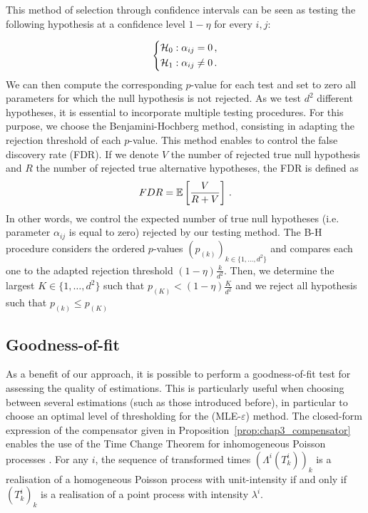    This method of selection through confidence intervals can be seen as testing the following hypothesis at a confidence level $1-\eta$ for every $i,j$:
   
   \[
   \begin{dcases}
       \mathcal{H}_0 : \alpha_{ij} = 0 \,,\\
       \mathcal{H}_1 : \alpha_{ij} \neq 0\,.
   \end{dcases}
   \]
   We can then compute the corresponding $p$-value for each test and set to zero all parameters for which the null hypothesis is not rejected. As we test $d^2$ different hypotheses, it is essential to incorporate multiple testing procedures. For this purpose, we choose the Benjamini-Hochberg method, consisting in adapting the rejection threshold of each $p$-value. This method enables to control the false discovery rate (FDR). If we denote $V$ the number of rejected true null hypothesis and $R$ the number of rejected true alternative hypotheses, the FDR is defined as \[FDR = {\mathbb E}\left[\frac{V}{R+V}\right]\,.\] In other words, we control the expected number of true null hypotheses (i.e. parameter $\alpha_{ij}$ is equal to zero) rejected by our testing method. The B-H procedure considers the ordered $p$-values $(p_{(k)})_{k\in\{1, \ldots, d^2\}}$ and compares each one to the adapted rejection threshold $(1-\eta) \frac{k}{d^2}$. Then, we determine the largest $K\in\{1, \ldots, d^2\}$ such that $p_{(K)} < (1-\eta) \frac{K}{d^2}$ and we reject all hypothesis such that $p_{(k)} \leq p_{(K)}$

  \subsection{Goodness-of-fit}\label{sec:chap3_goodness}
    As a benefit of our approach, it is possible to perform a goodness-of-fit test for assessing the quality of estimations. This is particularly useful when choosing between several estimations (such as those introduced before), in particular to choose an optimal level of thresholding for the (MLE-$\varepsilon$) method.
    The closed-form expression of the compensator given in Proposition~\ref{prop:chap3_compensator} enables the use of the Time Change Theorem for inhomogeneous Poisson processes \textcite[Proposition 7.4.IV]{DaleyV1}.
    For any $i$, the sequence of transformed times $(\Lambda^i(T_k^i))_k$ is a realisation of a homogeneous Poisson process with unit-intensity if and only if $(T_k^i)_k$ is a realisation of a point process with intensity $\lambda^i$.

